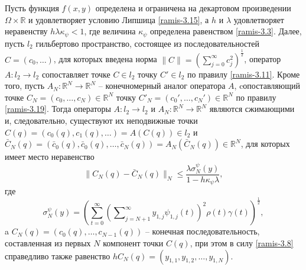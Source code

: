 \begin{theorem}\label{ramis-RItheo3}
Пусть функция   $f(x,y)$  определена и ограничена на декартовом произведении $\Omega\times\mathbb{R}$ и удовлетворяет условию Липшица \eqref{ramis-3.15}, а $h$ и $\lambda$ удовлетворяет неравенству $h\lambda\kappa_\psi<1$, где величина $\kappa_\psi$ определена равенством \eqref{ramis-3.3}. Далее, пусть $l_2$ гильбертово пространство, состоящее из последовательностей $C=(c_0,\ldots)$, для которых введена норма $\|C\|=\left(\sum_{j=0}^\infty c_j^2\right)^\frac12$,   оператор $A: l_2\to l_2$ сопоставляет точке $C\in l_2$ точку $C'\in l_2$ по правилу \eqref{ramis-3.11}. Кроме того, пусть $A_N:\mathbb{R}^N\to \mathbb{R}^N$ -- конечномерный аналог оператора $A$, cопоставляющий точке $C_N=(c_0,\ldots,c_{N})\in \mathbb{R}^N $ точку  $C'_N=(c_0',\ldots,c_{N}')\in \mathbb{R}^N $ по правилу \eqref{ramis-3.19}.
Тогда операторы $A: l_2\to l_2$ и $A_N:\mathbb{R}^N\to \mathbb{R}^N$ являются сжимающими и, следовательно, существуют  их неподвижные точки $C(q)=(c_0(q),c_1(q),\ldots)=A(C(q))\in l_2$ и $\bar C_N(q)=(\bar c_0(q),\bar c_0(q),\ldots,\bar c_{N}(q))=A_N(\bar C_N(q))\in \mathbb{R}^N$, для которых имеет место неравенство
\begin{equation}\label{ramis-3.28}
\|C_N(q)-\bar C_N(q)\|_N\le \frac{\lambda \sigma_N^\psi(y)}{1-h\kappa_\psi\lambda},
\end{equation}
где
\begin{equation}\label{ramis-3.30}
\sigma_N^\psi(y)=\left(\sum_{t=0}^\infty\left(\sum\nolimits_{j=N+1}^\infty  y_{1,j}\psi_{1,j}(t)\right)^2\rho(t)\gamma(t) \right)^\frac12,
\end{equation}
 a $C_N(q)=(c_0(q),\ldots,c_{N-1}(q))$ -- конечная последовательность, составленная из первых $N$ компонент точки  $C(q)$, при этом в силу  \eqref{ramis-3.8} справедливо также равенство  $hC_N(q)=(y_{1,1}, y_{1,2}, \ldots, y_{1,N})$.
\end{theorem}











